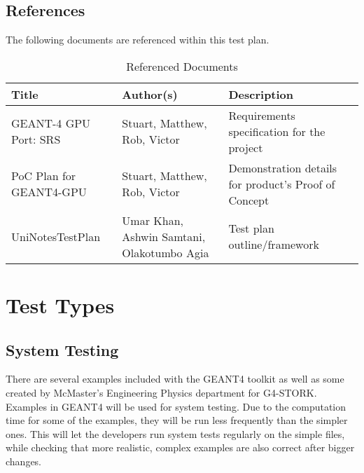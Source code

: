 \documentclass[12pt]{article}
\begin{document}
\subsection{References}%
The following documents are referenced within this test plan.

\begin{center}
\begin{longtable}{>{\raggedright\arraybackslash}p{}>{\raggedright\arraybackslash}p{}>{\raggedright\arraybackslash}p{}}
\caption{Referenced Documents}\label{Table_References}\\
\toprule

\bf Title & \bf Author(s) & \bf Description\\\midrule
GEANT-4 GPU Port: SRS & Stuart, Matthew, Rob, Victor & Requirements specification for the project\\\midrule
PoC Plan for GEANT4-GPU & Stuart, Matthew, Rob, Victor & Demonstration details for product's Proof of Concept\\\midrule
UniNotesTestPlan & Umar Khan, Ashwin Samtani, Olakotumbo Agia & Test plan outline/framework\\

\bottomrule
\end{longtable}
\end{center}
\section{Test Types}

\subsection{System Testing} %
There are several examples included with the GEANT4 toolkit as well as some created by McMaster's Engineering Physics department for G4-STORK. Examples in GEANT4 will be used for system testing. Due to the computation time for some of the examples, they will be run less frequently than the simpler ones. This will let the developers run system tests regularly on the simple files, while checking that more realistic, complex examples are also correct after bigger changes.
\end{document}

